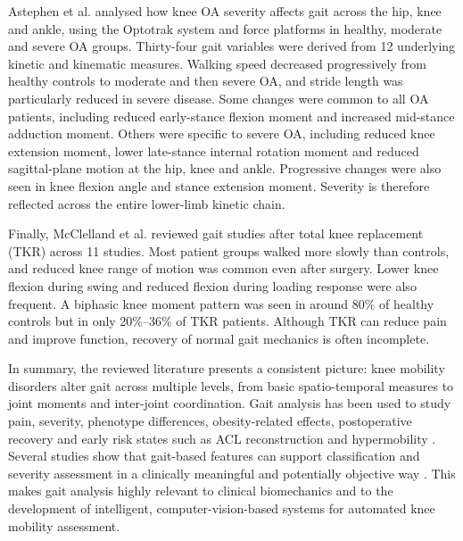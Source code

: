 \documentclass[12pt]{elsarticle}
\begin{document}
Astephen et al. \cite{astephen2008biomechanical} { analysed} how knee OA severity affects gait across the hip, { knee and ankle,} using the Optotrak system and force { platforms in healthy, moderate and severe OA groups. Thirty-four gait variables were derived} from 12 underlying kinetic and kinematic measures. { Walking} speed decreased progressively from healthy controls to moderate and then severe OA, { and} stride length was particularly reduced in severe disease. Some changes were common to all OA patients, { including} reduced early-stance flexion moment and increased mid-stance adduction { moment. Others} were specific to severe OA, including reduced knee extension moment, lower late-stance internal rotation { moment} and reduced sagittal-plane motion at the hip, { knee} and ankle. Progressive changes were also { seen} in knee flexion angle and { stance extension moment. Severity is therefore} reflected across the entire lower-limb kinetic chain.

Finally, McClelland et al. \cite{mcclelland2007gait} reviewed gait studies { after} total knee replacement (TKR) { across 11 studies. Most} patient groups walked more slowly than controls, and reduced knee range of motion { was} common even after surgery. Lower knee flexion during swing and reduced flexion during loading response were also { frequent. A} biphasic knee moment pattern was seen in around 80\% of healthy controls { but} in only 20\%--36\% of TKR patients. { Although} TKR can reduce pain and improve function, recovery of normal gait mechanics is often incomplete.

In summary, the reviewed literature presents a consistent picture: knee mobility disorders alter gait across multiple levels, from basic spatio-temporal measures to joint moments and inter-joint { coordination.} Gait analysis has been used to study pain, severity, phenotype differences, obesity-related effects, postoperative { recovery} and early risk states such as ACL reconstruction and hypermobility \cite{simonsen2012gait,butler2009gait,harding2012body,astephen2008biomechanical}. { Several} studies show that gait-based features can support classification and severity assessment in a clinically meaningful and potentially objective { way} \cite{elbaz2014novel,bacon2022relation,weidow2006hip}. This makes gait analysis highly relevant { to clinical biomechanics and to} the development of { intelligent,} computer-vision-based systems for automated knee mobility assessment.
\end{document}
